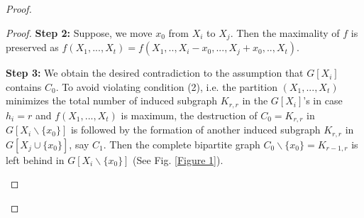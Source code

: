 \documentclass[12pt,reqno,a4paper]{amsart}
\theoremstyle{definition}
\begin{document}
\begin{proof}
\begin{enumerate}
\begin{proof}
\textbf{Step 2:} Suppose, we move $x_{0}$ from $X_{i}$ to $X_{j}$. Then the maximality of $f$ is preserved as
$f(X_{1},..., X_{t}) = f(X_{1},.., X_{i}-x_{0},..., X_{j}+x_{0},.., X_{t})$.
\vspace{2mm}

\textbf{Step 3:} We obtain the desired contradiction to the assumption that $G[X_{i}]$ contains $C_{0}$. To avoid violating condition (2), i.e. the partition $(X_{1},..., X_{t})$ minimizes the total number of induced subgraph $K_{r,r}$ in the $G[X_{i}]$'s in case $h_{i}=r$ and $f(X_{1},..., X_{t})$ is maximum, 
the destruction of $C_{0}=K_{r,r}$ in $G[X_{i}\backslash \{x_{0}\}]$ is followed by the formation of another induced subgraph $K_{r,r}$ in $G[X_{j}\cup \{x_{0}\}]$, say $C_{1}$. 
Then the complete bipartite graph $C_{0}\backslash\{x_{0}\}=K_{r-1,r}$ is left behind in $G[X_{i}\backslash \{x_{0}\}]$ (See Fig. \ref{Figure 1}).

\newcommand{\rsize}{5} %

\begin{figure}[h]
\centering

\end{figure}
\end{proof}
\end{enumerate}
\end{proof}
\end{document}
